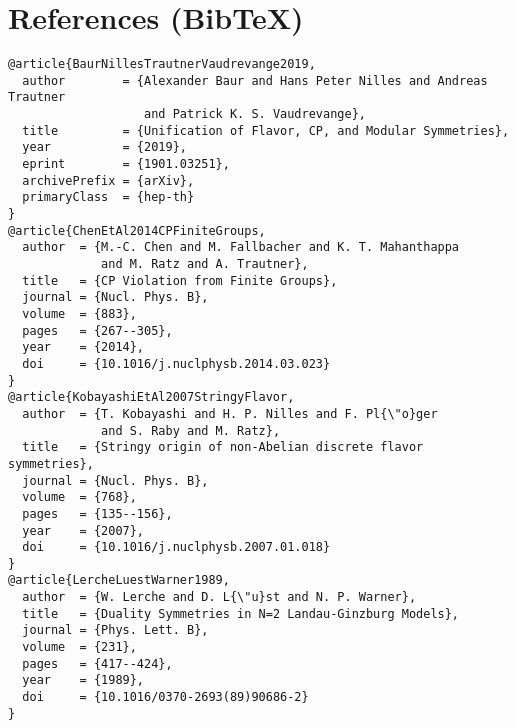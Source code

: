 \documentclass[11pt]{article}
\begin{document}
  \section*{References (Bib\TeX)}
  \begin{verbatim}
@article{BaurNillesTrautnerVaudrevange2019,
  author        = {Alexander Baur and Hans Peter Nilles and Andreas Trautner
                   and Patrick K. S. Vaudrevange},
  title         = {Unification of Flavor, CP, and Modular Symmetries},
  year          = {2019},
  eprint        = {1901.03251},
  archivePrefix = {arXiv},
  primaryClass  = {hep-th}
}
@article{ChenEtAl2014CPFiniteGroups,
  author  = {M.-C. Chen and M. Fallbacher and K. T. Mahanthappa
             and M. Ratz and A. Trautner},
  title   = {CP Violation from Finite Groups},
  journal = {Nucl. Phys. B},
  volume  = {883},
  pages   = {267--305},
  year    = {2014},
  doi     = {10.1016/j.nuclphysb.2014.03.023}
}
@article{KobayashiEtAl2007StringyFlavor,
  author  = {T. Kobayashi and H. P. Nilles and F. Pl{\"o}ger
             and S. Raby and M. Ratz},
  title   = {Stringy origin of non-Abelian discrete flavor symmetries},
  journal = {Nucl. Phys. B},
  volume  = {768},
  pages   = {135--156},
  year    = {2007},
  doi     = {10.1016/j.nuclphysb.2007.01.018}
}
@article{LercheLuestWarner1989,
  author  = {W. Lerche and D. L{\"u}st and N. P. Warner},
  title   = {Duality Symmetries in N=2 Landau-Ginzburg Models},
  journal = {Phys. Lett. B},
  volume  = {231},
  pages   = {417--424},
  year    = {1989},
  doi     = {10.1016/0370-2693(89)90686-2}
}
  \end{verbatim}



  \ifdefined\standalonechapter\else
  
  
\end{document}
